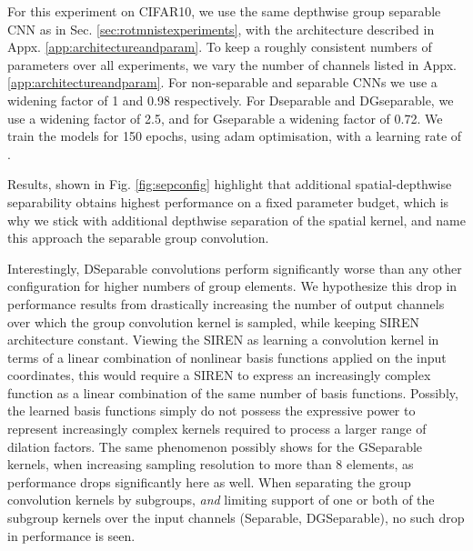 \documentclass[nohyperref]{article}
\theoremstyle{plain}
\theoremstyle{definition}
\theoremstyle{remark}
\begin{document}
For this experiment on CIFAR10, we use the same depthwise group separable CNN as in Sec. \ref{sec:rotmnistexperiments}, with the architecture described in Appx. \ref{app:architectureandparam}. To keep a roughly consistent numbers of parameters over all experiments, we vary the number of channels listed in Appx. \ref{app:architectureandparam}. For non-separable and separable CNNs we use a widening factor of 1 and 0.98 respectively. For Dseparable and DGseparable, we use a widening factor of 2.5, and for Gseparable a widening factor of 0.72. We train the models for 150 epochs, using adam optimisation, with a learning rate of .





Results, shown in Fig. \ref{fig:sepconfig} highlight that additional spatial-depthwise separability obtains highest performance on a fixed parameter budget, which is why we stick with additional depthwise separation of the spatial kernel, and name this approach the separable group convolution.

Interestingly, DSeparable convolutions perform significantly worse than any other configuration for higher numbers of group elements. We hypothesize this drop in performance results from drastically increasing the number of output channels over which the group convolution kernel is sampled, while keeping SIREN architecture constant. Viewing the SIREN as learning a convolution kernel in terms of a linear combination of nonlinear basis functions applied on the input coordinates, this would require a SIREN to express an increasingly complex function as a linear combination of the same number of basis functions. Possibly, the learned basis functions simply do not possess the expressive power to represent increasingly complex kernels required to process a larger range of dilation factors. The same phenomenon possibly shows for the GSeparable kernels, when increasing sampling resolution to more than 8 elements, as performance drops significantly here as well. When separating the group convolution kernels by subgroups, \textit{and} limiting support of one or both of the subgroup kernels over the input channels (Separable, DGSeparable), no such drop in performance is seen.
\end{document}
